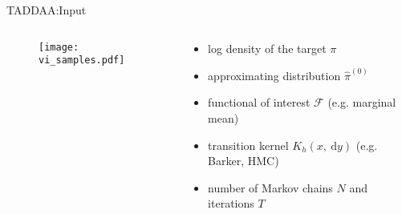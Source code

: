 \documentclass[10pt,xcolor=table]{beamer}
\begin{document}
\begin{frame}{TADDAA:Input}
\begin{columns}
  \begin{column}{0.5\linewidth}
\begin{figure}
  \begin{center}
    \texttt{[image: vi\_samples.pdf]}
  \end{center}
\end{figure}
  \end{column}
  \begin{column}{0.5 \linewidth}

        \begin{itemize}
            \item log density of the target $\pi$
            \item approximating distribution $\hat{\pi}^{(0)}$
            \item functional of interest $\mathcal{F}$ (e.g. marginal mean)
            \item transition kernel $K_h(x, \mathrm{~d} y)$ (e.g. Barker, HMC) %
            \item number of Markov chains $N$ and iterations $T$
        \end{itemize}
  \end{column}
\end{columns}
\end{frame}
\end{document}
